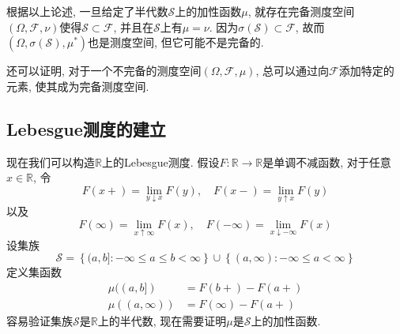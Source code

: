 \documentclass[cn, 12pt, math=mtpro2, bibstyle=apa, blue, twocol]{elegantbook}
\newcommand{\F}{\mathcal{F}}
\newcommand{\R}{\mathbb{R}}
\newcommand{\SE}{\mathcal{S}}
\newcommand{\overbar}[1]{\mkern 1.5mu\overline{\mkern-1.5mu#1\mkern-1.5mu}\mkern 1.5mu}
\begin{document}

 根据以上论述, 一旦给定了半代数$\SE$上的加性函数$\mu$, 就存在完备测度空间$(\Omega,\F,\nu)$使得$\SE\subset\F$, 并且在$\SE$上有$\mu=\nu$. 因为$\sigma(\SE)\subset \F$, 故而$(\Omega,\sigma(\SE),\mu^\ast)$也是测度空间, 但它可能不是完备的.

 还可以证明, 对于一个不完备的测度空间$(\Omega,\F,\mu)$, 总可以通过向$\F$添加特定的元素, 使其成为完备测度空间.


\subsection{Lebesgue测度的建立}
现在我们可以构造$\R$上的Lebesgue测度. 假设$F:\R\to\R$是单调不减函数, 对于任意$x\in\R$, 令
\begin{equation}\label{eq1.1}
  F(x+)=\lim_{y\downarrow x}F(y),\quad F(x-)=\lim_{y\uparrow x}F(y)
\end{equation}
以及
\begin{equation}\label{eq1.2}
  F(\infty)=\lim_{x\uparrow\infty}F(x),\quad F(-\infty)=\lim_{x\downarrow-\infty}F(x)
\end{equation}
设集族
\begin{equation}\label{eq1.3}
  \SE=\left\{(a,b]:-\infty\leq a\leq b<\infty \right\}\cup\left\{(a,\infty):-\infty\leq a<\infty \right\}
\end{equation}
定义集函数
\begin{align}
\mu((a,b])&=F(b+)-F(a+) \label{eq1.4} \\
\mu((a,\infty))&=F(\infty)-F(a+) \label{eq1.5}
\end{align}
容易验证集族$\SE$是$\R$上的半代数, 现在需要证明$\mu$是$\SE$上的加性函数.
\end{document}
